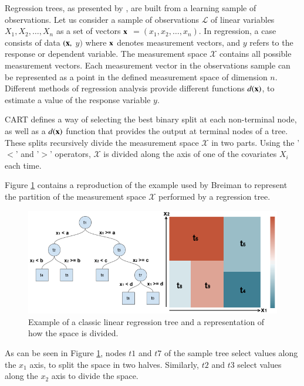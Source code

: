 \documentclass[times,twocolumn,final,authoryear]{elsarticle}
\begin{document}
Regression trees, as presented by \citep{Breimanetal1984}, are built from a learning sample of observations. Let us consider a sample of observations $\mathcal{L}$ of linear variables $ X_1, X_2, \dots, X_n $ as a set of vectors $\bf{x} $ $= (x_1, x_2, \dots, x_n)$. In regression, a case consists of data $(\bf{x},$ $y)$ where $\bf{x}$ denotes measurement vectors, and $ y $ refers to the response or dependent variable. The measurement space $\mathcal{X}$ contains all possible measurement vectors. Each measurement vector in the observations sample can be represented as a point in the defined measurement space of dimension $n$. Different methods of regression analysis provide different functions $d(\bf{x})$, to estimate a value of the response variable $y$.

CART defines a way of selecting the best binary split at each non-terminal node, as well as a $d(\bf{x})$ function that provides the output at terminal nodes of a tree. These splits recursively divide the measurement space $\mathcal{X}$ in two parts. Using the '$<$' and '$>$' operators, $\mathcal{X}$ is divided along the axis of one of the covariates $X_i$ each time.

Figure \ref{f1} contains a reproduction of the example used by Breiman to represent the partition of the measurement space $\mathcal{X}$ performed by a regression tree.

\begin{figure}
  \includegraphics[width=17cm]{fig1_master.png}
\caption{Example of a classic linear regression tree and a representation of how the space is divided. }
\label{f1}       %
\end{figure}
%
 
As can be seen in Figure \ref{f1}, nodes $t1$ and $t7$ of the sample tree select values along the $x_1$ axis, to split the space in two halves. Similarly, $t2$ and $t3$ select values along the $x_2$ axis to divide the space.
\end{document}
